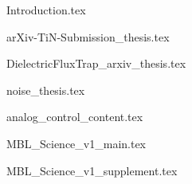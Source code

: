 





\begin{frontmatter}










\cleardoublepage
{}
\begin{singlespace}
\tableofcontents
\end{singlespace}

\end{frontmatter}

\pagestyle{plain} %

%
{Introduction.tex}

{arXiv-TiN-Submission_thesis.tex}

{DielectricFluxTrap_arxiv_thesis.tex}

{noise_thesis.tex}

{analog_control_content.tex}


{MBL_Science_v1_main.tex}

{MBL_Science_v1_supplement.tex}





%
%
\printbibliography


